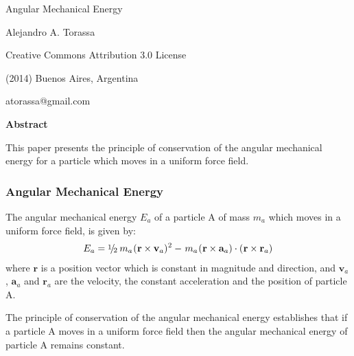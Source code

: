 \documentclass[10pt]{article}
\newcommand{\mM}{m}
\newcommand{\mE}{E}
\newcommand{\ra}{_a}
\newcommand{\vR}{\mathbf{r}}
\newcommand{\vV}{\mathbf{v}}
\newcommand{\vA}{\mathbf{a}}
\newcommand{\med}{\raise.5ex\hbox{$\scriptstyle 1$}\kern-.15em/\kern-.15em\lower.25ex\hbox{$\scriptstyle 2$}}
\begin{document}
\begin{center}

{\LARGE Angular Mechanical Energy}

\bigskip \medskip

Alejandro A. Torassa

\bigskip \medskip

\footnotesize

Creative Commons Attribution 3.0 License

(2014) Buenos Aires, Argentina

atorassa@gmail.com

\bigskip \smallskip

\small

{\bf Abstract}

\bigskip \smallskip

\parbox{72mm}{This paper presents the principle of conservation of the angular mechanical energy for a particle which moves in a uniform force field.}

\end{center}

\normalsize

\vspace{-0.30em}

{\centering\subsubsection*{Angular Mechanical Energy}}

\vspace{+0.75em}

\par The angular mechanical energy $\mE\ra$ of a particle A of mass $\mM\ra$ which moves in a uniform force field, is given by:
\begin{eqnarray*}
\mE\ra = \med \hspace{+0.24em} \mM\ra \hspace{+0.06em} (\hspace{+0.03em} \vR \times \vV\ra)^{\hspace{+0.03em} 2} - \hspace{+0.09em} \mM\ra \hspace{+0.06em} (\hspace{+0.03em} \vR \times \vA\ra) \cdot (\hspace{+0.03em} \vR \times \vR\ra)
\end{eqnarray*}
\noindent where $\vR$ is a position vector which is constant in magnitude and direction, and $\vV\ra$, $\vA\ra$ and $\vR\ra$ are the velocity, the constant acceleration and the position of particle A.
\medskip
\par The principle of conservation of the angular mechanical energy establishes that if a particle A moves in a uniform force field then the angular mechanical energy of particle A remains constant.
\end{document}
